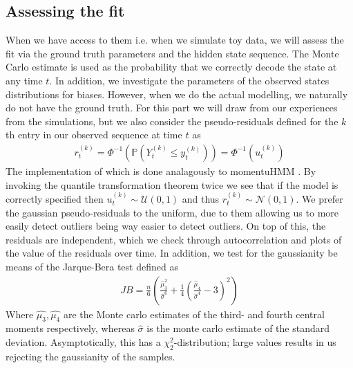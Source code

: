 \subsection{Assessing the fit}
When we have access to them i.e. when we simulate toy data, we will assess the fit via the ground truth parameters and the hidden state sequence. The Monte Carlo estimate is used as the probability that we correctly decode the state at any time $t$. In addition, we investigate the parameters of the observed states distributions for biases. However, when we do the actual modelling, we naturally do not have the ground truth. For this part we will draw from our experiences from the simulations, but we also consider the pseudo-residuals defined for the $k$th entry in our observed sequence at time $t$ as \cite{HHMForTimesSeries}
\begin{align}
    r_t^{(k)} = \Phi^{-1}\left(\mathbb{P}\left(Y_t^{(k)} \leq y_t^{(k)}\right)\right) = \Phi^{-1}\left(u_t^{(k)}\right)
\end{align}
The implementation of which is done analagously to momentuHMM \cite{momentuHMM}.
By invoking the quantile transformation theorem twice we see that if the model is correctly specified then $u_t^{(k)}\sim \mathcal{U}(0,1)$ and thus $r_t^{(k)}\sim\mathcal{N}\left(0,1\right)$. We prefer the gaussian pseudo-residuals to the uniform, due to them allowing us to more easily detect outliers being way easier to detect outliers. On top of this, the residuals are independent, which we check through autocorrelation and plots of the value of the residuals over time. In addition, we test for the gaussianity be means of the Jarque-Bera test defined as
\begin{align}
    JB = \frac{n}{6}\left(\frac{\hat{\mu}_3^2}{\hat{\sigma}^6}+\frac{1}{4}\left(\frac{\hat{\mu}_4}{\hat{\sigma}^4}-3\right)^2\right)
\end{align}
Where $\hat{\mu_3}, \hat{\mu_4}$ are the Monte carlo estimates of the third- and fourth central moments respectively, whereas $\hat{\sigma}$ is the monte carlo estimate of the standard deviation. Asymptotically, this has a $\chi_2^2$-distribution; large values results in us rejecting the gaussianity of the samples.\cite{tseries}
